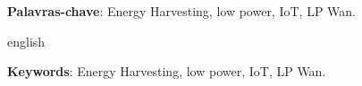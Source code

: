 
\setlength{\absparsep}{18pt} %
\begin{resumo}
  
 \textbf{Palavras-chave}: Energy Harvesting, low power, IoT, LP Wan.
\end{resumo}

\begin{resumo}[Abstract]
 \begin{otherlanguage*}{english}

   \vspace{\onelineskip}
 
   \noindent 
   \textbf{Keywords}: Energy Harvesting, low power, IoT, LP Wan.
 \end{otherlanguage*}
\end{resumo}


\listoffigures*
\cleardoublepage

\listofquadros*
\cleardoublepage

\listoftables*
\cleardoublepage

